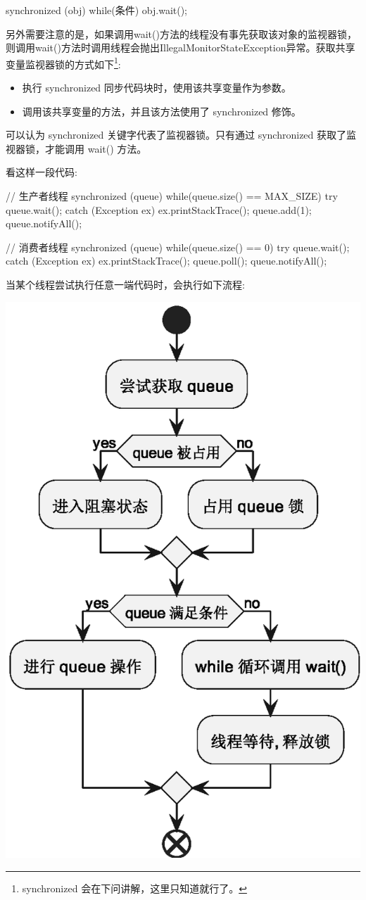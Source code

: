 \begin{Java}
synchronized (obj) {
    while(条件) {
        obj.wait();
    }
}
\end{Java}


另外需要注意的是，如果调用wait()方法的线程没有事先获取该对象的监视器锁，则调用wait()方法时调用线程会抛出IllegalMonitorStateException异常。获取共享变量监视器锁的方式如下\footnote{synchronized 会在下问讲解，这里只知道就行了。}:
\begin{itemize}
    \item 执行 synchronized 同步代码块时，使用该共享变量作为参数。
    \item 调用该共享变量的方法，并且该方法使用了 synchronized 修饰。
\end{itemize}

可以认为 synchronized 关键字代表了监视器锁。只有通过 synchronized 获取了监视器锁，才能调用 wait() 方法。

看这样一段代码:
\begin{Java}
// 生产者线程
synchronized (queue) {
    while(queue.size() == MAX_SIZE) {
        try {
            queue.wait();
        } catch (Exception ex) {
            ex.printStackTrace();
        }
    }
    queue.add(1);
    queue.notifyAll();
}

// 消费者线程
synchronized (queue) {
    while(queue.size() == 0) {
        try {
            queue.wait();
        } catch (Exception ex) {
            ex.printStackTrace();
        }
    }
    queue.poll();
    queue.notifyAll();
}
\end{Java}

当某个线程尝试执行任意一端代码时，会执行如下流程:

\begin{center}
    \includegraphics[width=0.4\linewidth]{../../../Images/syn.eps}
\end{center}


